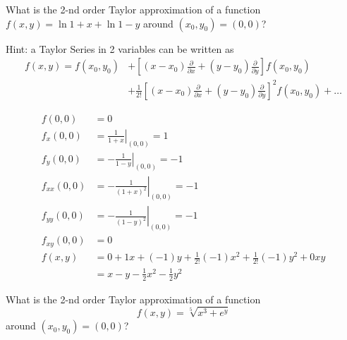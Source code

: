 \documentclass
[answers]
{exercise_sheet}
\begin{document}
\begin{Question}{4}
What is the 2-nd order Taylor approximation of a function $f(x,y) = \ln{1+x} + \ln{1-y}$ around $(x_0,y_0) = (0,0)$?

Hint: a Taylor Series in 2 variables can be written as
\begin{align*}
f(x,y) = f(x_0,y_0) & + \left[ (x-x_0) \frac{\partial}{\partial x} + (y-y_0) \frac{\partial}{\partial y} \right] f(x_0,y_0) \\
& +\frac{1}{2!} \left[ (x-x_0) \frac{\partial}{\partial x} + (y-y_0)\frac{\partial}{\partial y} \right]^2 f(x_0,y_0) + \ldots
\end{align*}
\end{Question}

\makeatletter\if@answers\begin{Answer}{10}
\begin{align*} 
f(0,0) &= 0 \\
f_x(0,0) &= \left. \frac{1}{1+x} \right|_{(0,0)} = 1 \\
f_y(0,0) &= \left. -\frac{1}{1-y} \right|_{(0,0)} = -1 \\
f_{xx}(0,0) &= \left. -\frac{1}{(1+x)^2} \right|_{(0,0)} = -1 \\
f_{yy}(0,0) &= \left. -\frac{1}{(1-y)^2}\right |_{(0,0)} = -1 \\
f_{xy}(0,0) &= 0 \\
f(x,y) &= 0+1x+(-1)y+\frac{1}{2!}(-1)x^2+\frac{1}{2!}(-1)y^2+0xy \\
&= x - y - \frac{1}{2}x^2 - \frac{1}{2}y^2
\end{align*}
\end{Answer}\fi\makeatother

\begin{Question}{4}
What is the 2-nd order Taylor approximation of a function 
\begin{equation*}
f(x,y) = \sqrt[5]{x^3+ e^y}
\end{equation*}
around $(x_0,y_0) = (0,0)$?
\end{Question}
\end{document}
